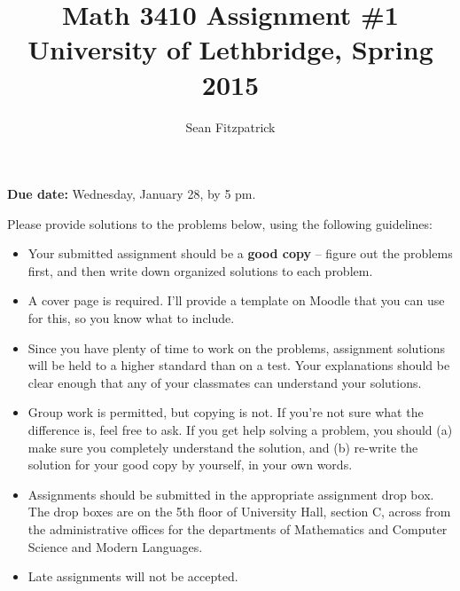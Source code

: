 \documentclass[letterpaper,12pt]{article}
\title{Math 3410 Assignment \#1\\University of Lethbridge, Spring 2015}
\author{Sean Fitzpatrick}
\begin{document}
 \maketitle

{\bf Due date:} Wednesday, January 28, by 5 pm.

\bigskip

Please provide solutions to the problems below, using the following guidelines:
\begin{itemize}
\item Your submitted assignment should be a {\bf good copy} -- figure out the problems first, and then write down organized solutions to each problem. 
\item A cover page is required. I'll provide a template on Moodle that you can use for this, so you know what to include.
\item Since you have plenty of time to work on the problems, assignment solutions will be held to a higher standard than on a test. Your explanations should be clear enough that any of your classmates can understand your solutions.
\item Group work is permitted, but copying is not. If you're not sure what the difference is, feel free to ask. If you get help solving a problem, you should (a) make sure you completely understand the solution, and (b) re-write the solution for your good copy by yourself, in your own words.
\item Assignments should be submitted in the appropriate assignment drop box. The drop boxes are on the 5th floor of University Hall, section C, across from the administrative offices for the departments of Mathematics and Computer Science and Modern Languages. 
\item Late assignments will not be accepted.

\end{itemize}
\newpage
\end{document}
